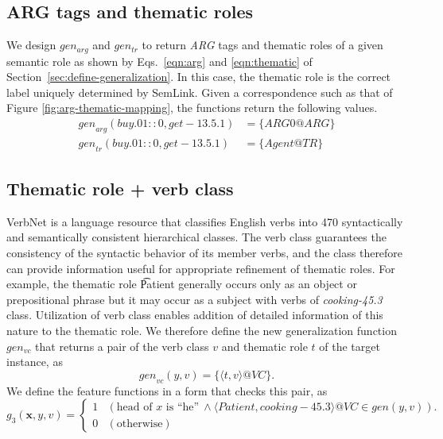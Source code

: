\documentclass[english]{jnlp_1.4_rep}
\begin{document}
\subsection{ARG tags and thematic roles}

We design $gen_{arg}$ and $gen_{tr}$ to return {\it ARG} tags and thematic roles of a given semantic role as shown by Eqs.~\ref{eqn:arg} and \ref{eqn:thematic} of Section~\ref{sec:define-generalization}. In this case, the thematic role is the correct label uniquely determined by SemLink. Given a correspondence such as that of Figure \ref{fig:arg-thematic-mapping}, the functions return the following values.
\begin{align}
\mathit{gen}_\mathit{arg}(\mathit{buy.01::0}, \mathit{get-13.5.1}) & = \{\mathit{ARG0@ARG}\} \\
\mathit{gen}_\mathit{tr}(\mathit{buy.01::0}, \mathit{get-13.5.1}) & = \{\mathit{Agent@TR}\}
\end{align}


\subsection{Thematic role + verb class}

VerbNet is a language resource that classifies English verbs into 470 syntactically and semantically consistent hierarchical classes. The verb class guarantees the consistency of the syntactic behavior of its member verbs, and the class therefore can provide information useful for appropriate refinement of thematic roles. For example, the thematic role {\t Patient} generally occurs only as an object or prepositional phrase but it may occur as a subject with verbs of {\it cooking-45.3} class. Utilization of verb class enables addition of detailed information of this nature to the thematic role. We therefore define the new generalization function $gen_{vc}$ that returns a pair of the verb class $v$ and thematic role $t$ of the target instance, as
\begin{equation}
\mathit{gen}_\mathit{vc}(y,v) = \{\langle t, v\rangle@VC\}.
\end{equation}
We define the feature functions in a form that checks this pair, as
\begin{equation}
 g_3(\mathbf{x},y,v) =
  \begin{cases}
   1 & (\mbox{head of }x\mbox{ is ``he''}~\wedge \langle\mathit{Patient},\mathit{cooking-45.3}\rangle@VC \in \mathit{gen}(y,v) ).\\
   0 & (\mbox{otherwise})
  \end{cases}
\end{equation}
\end{document}
